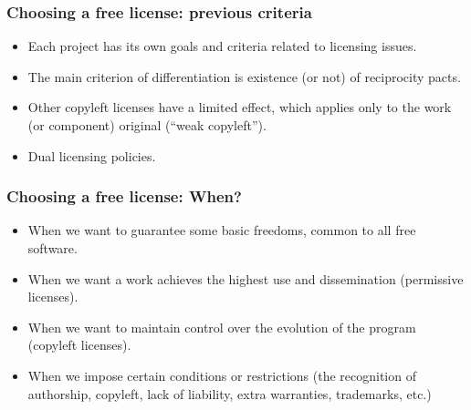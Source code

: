 \documentclass{beamer}
\begin{document}


\begin{frame}
\frametitle{Choosing a free license: previous criteria}

\begin{itemize}
\item Each project has its own goals and criteria related to licensing issues.
\item The \alert{main criterion} of differentiation is existence (or not) of \alert{reciprocity pacts}.
\item Other copyleft licenses have a limited effect, which applies only to the work (or component) original (``weak copyleft''). 
\item \alert{Dual licensing} policies.

\end{itemize}

\end{frame}


\begin{frame}
\frametitle{Choosing a free license: When?}

\begin{itemize}
\item When we want to guarantee some basic freedoms, common to all free software.
\item When we want a work achieves the highest use and dissemination (permissive licenses).
\item When we want to maintain control over the evolution of the program (copyleft licenses).
\item When we impose certain conditions or restrictions (the recognition of authorship, copyleft, lack of liability, extra warranties, trademarks, etc.)
\end{itemize}

\end{frame}

\end{document}
